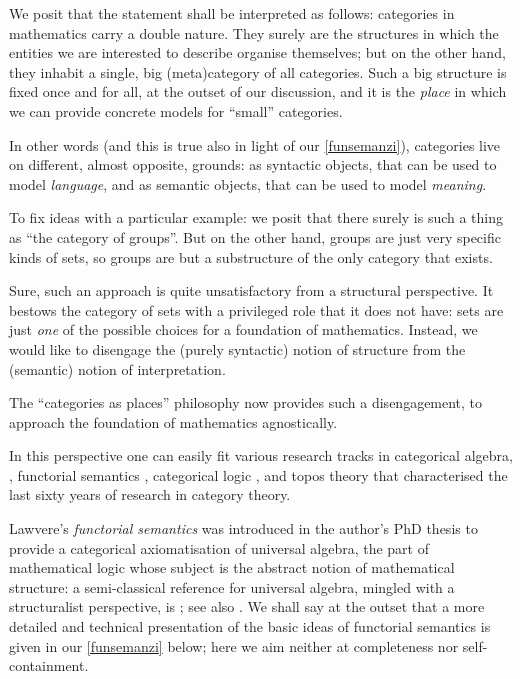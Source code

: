We posit that the statement shall be interpreted as follows: categories in mathematics carry a double nature. They surely are the structures in which the entities we are interested to describe organise themselves; but on the other hand, they inhabit a single, big (meta)category of all categories. Such a big structure is fixed once and for all, at the outset of our discussion, and it is the \emph{place} in which we can provide concrete models for ``small'' categories.

In other words (and this is true also in light of our \autoref{funsemanzi}), categories live on different, almost opposite, grounds: as syntactic objects, that can be used to model \emph{language}, and as semantic objects, that can be used to model \emph{meaning}.

To fix ideas with a particular example: we posit that there surely is such a thing as ``the category of groups''. But on the other hand, groups are just very specific kinds of sets, so groups are but a substructure of the only category that exists.

Sure, such an approach is quite unsatisfactory from a structural perspective. It bestows the category of sets with a privileged role that it does not have: sets are just \emph{one} of the possible choices for a foundation of mathematics. Instead, we would like to disengage the (purely syntactic) notion of structure from the (semantic) notion of interpretation.

The ``categories as places'' philosophy now provides such a disengagement, to approach the foundation of mathematics agnostically.

In this perspective one can easily fit various research tracks in categorical algebra, \cite{Janelidze2004}, functorial semantics \cite{lawvere1963functorial,hyland2007category}, categorical logic \cite{lambek1988introduction}, and topos theory \cite{JohnstonePT} that characterised the last sixty years of research in category theory.

Lawvere's \emph{functorial semantics} was introduced in the author's PhD thesis \cite{lawvere1963functorial} to provide a categorical axiomatisation of universal algebra, the part of mathematical logic whose subject is the abstract notion of mathematical structure: a semi-classical reference for universal algebra, mingled with a structuralist perspective, is \cite{manes2012algebraic}; see also \cite{sankappanavar}. We shall say at the outset that a more detailed and technical presentation of the basic ideas of functorial semantics is given in our \autoref{funsemanzi} below; here we aim neither at completeness nor self-containment.

